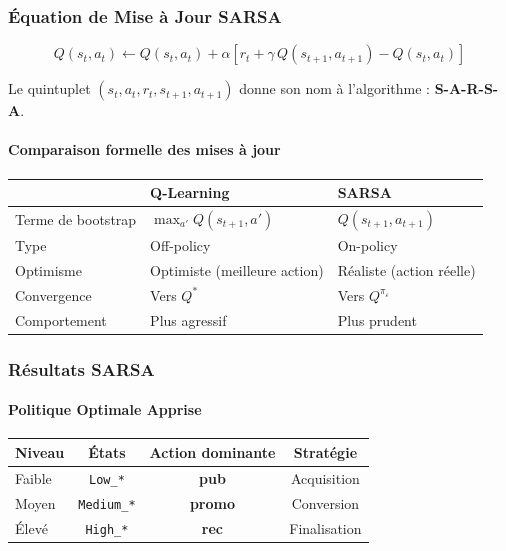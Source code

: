 \documentclass[11pt,a4paper]{article}
\begin{document}
\subsubsection{Équation de Mise à Jour SARSA}

\begin{tcolorbox}[colback=LightGreen,colframe=DarkGreen,arc=4pt]
\begin{equation}
  \boxed{Q(s_t, a_t) \leftarrow Q(s_t, a_t) + \alpha \left[r_t + \gamma \, Q(s_{t+1}, a_{t+1}) - Q(s_t, a_t)\right]}
\end{equation}
\end{tcolorbox}

Le quintuplet $(s_t, a_t, r_t, s_{t+1}, a_{t+1})$ donne son nom à l'algorithme : \textbf{S-A-R-S-A}.

\paragraph{Comparaison formelle des mises à jour}

\begin{center}
\begin{tabular}{p{3cm}p{5.5cm}p{5cm}}
\toprule
\rowcolor{LightBlue}
& \textbf{Q-Learning} & \textbf{SARSA} \\
\midrule
Terme de bootstrap & $\max_{a'} Q(s_{t+1}, a')$ & $Q(s_{t+1}, a_{t+1})$ \\
Type & Off-policy & On-policy \\
Optimisme & Optimiste (meilleure action) & Réaliste (action réelle) \\
Convergence & Vers $Q^*$ & Vers $Q^{\pi_\varepsilon}$ \\
Comportement & Plus agressif & Plus prudent \\
\bottomrule
\end{tabular}
\end{center}

\subsubsection{Résultats SARSA}

\paragraph{Politique Optimale Apprise}

\begin{center}
\begin{tabular}{lccc}
\toprule
\rowcolor{LightGreen}
\textbf{Niveau} & \textbf{États} & \textbf{Action dominante} & \textbf{Stratégie} \\
\midrule
Faible & \texttt{Low\_*} & \textbf{pub} & Acquisition \\
Moyen  & \texttt{Medium\_*} & \textbf{promo} & Conversion \\
Élevé  & \texttt{High\_*} & \textbf{rec} & Finalisation \\
\bottomrule
\end{tabular}
\end{center}
\end{document}
